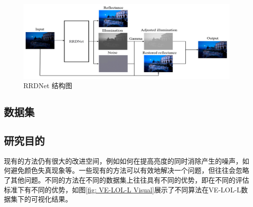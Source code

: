 \documentclass[a4paper]{ctexart}
\begin{document}
	\begin{figure}[htb]
		\centering 
		\includegraphics[width=0.7\columnwidth]{picture/LLIE/RRDNet/RRDNet}
		\caption{
			\label{fig: RRDNet} 
			RRDNet 结构图
		}
	\end{figure}
	
	\subsection{数据集}
	
	\subsection{研究目的}
	
	现有的方法仍有很大的改进空间，例如如何在提高亮度的同时消除产生的噪声，如何避免颜色失真现象等。一些现有的方法可以有效地解决一个问题，但往往会忽略了其他问题。不同的方法在不同的数据集上往往具有不同的优势，即在不同的评估标准下有不同的优势，如图\ref{fig: VE-LOL-L Visual}展示了不同算法在VE-LOL-L数据集下的可视化结果。
	
\end{document}
